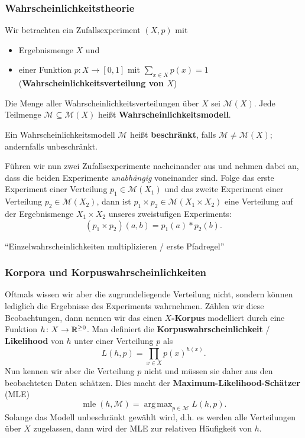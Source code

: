 \documentclass{beamer}
\DeclareMathOperator*{\argmax}{arg\,max}
\begin{document}
\begin{frame} \frametitle{Wahrscheinlichkeitstheorie}
	\justifying \footnotesize
	Wir betrachten ein Zufallsexperiment $(X,p)$ mit
	\begin{itemize}
		\item Ergebnismenge $X$ und
		\item einer Funktion $p \colon X \to [0,1]$ mit $\sum_{x \in X} p(x) = 1$ (\textbf{Wahrscheinlichkeitsverteilung von $X$})
	\end{itemize}
	\pause
	
	Die Menge aller Wahrscheinlichkeitsverteilungen über $X$ sei $\mathcal{M}(X)$. Jede Teilmenge $\mathcal{M} \subseteq \mathcal{M}(X)$ heißt \textbf{Wahrscheinlichkeitsmodell}.
	\pause
	
	Ein Wahrscheinlichkeitsmodell $\mathcal{M}$ heißt \textbf{beschränkt}, falls $\mathcal{M} \neq \mathcal{M}(X)$; andernfalls unbeschränkt.
	\pause
	
	Führen wir nun zwei Zufallsexperimente nacheinander aus und nehmen dabei an, dass die beiden Experimente \textit{unabhängig} voneinander sind. Folge das erste Experiment einer Verteilung $p_1 \in \mathcal{M}(X_1)$ und das zweite Experiment einer Verteilung $p_2 \in \mathcal{M}(X_2)$, dann ist $p_1 \times p_2 \in \mathcal{M}(X_1 \times X_2)$ eine Verteilung auf der Ergebnismenge $X_1 \times X_2$ unseres zweistufigen Experiments:
	\vspace{-.5\baselineskip}
	\begin{equation*}
		(p_1 \times p_2)(a,b) = p_1(a) * p_2(b) .
	\end{equation*}
	\vspace{-1.5\baselineskip}
	\begin{center}
		\enquote{Einzelwahrscheinlichkeiten multiplizieren / erste Pfadregel}
	\end{center}
\end{frame}

\begin{frame} \frametitle{Korpora und Korpuswahrscheinlichkeiten}
	\justifying \footnotesize
	Oftmals wissen wir aber die zugrundeliegende Verteilung nicht, sondern können lediglich die Ergebnisse des Experiments wahrnehmen. Zählen wir diese Beobachtungen, dann nennen wir das einen \textbf{$X$-Korpus} modelliert durch eine Funktion $h \colon X \to \mathbb{R}^{\ge 0}$.
	Man definiert die \textbf{Korpuswahrscheinlichkeit} / \textbf{Likelihood} von $h$ unter einer Verteilung $p$ als
	\begin{equation*}
		L(h,p) = \prod_{x \in X} p(x)^{h(x)} .
	\end{equation*} 
	Nun kennen wir aber die Verteilung $p$ nicht und müssen sie daher aus den beobachteten Daten schätzen. Dies macht der\textbf{ Maximum-Likelihood-Schätzer} (MLE)
	\begin{equation*}
		\operatorname{mle}(h,\mathcal{M}) = \argmax_{p \in \mathcal{M}} L(h,p) .
	\end{equation*}
	Solange das Modell unbeschränkt gewählt wird, d.h. es werden alle Verteilungen über $X$ zugelassen, dann wird der MLE zur relativen Häufigkeit von $h$.
\end{frame}
\end{document}
